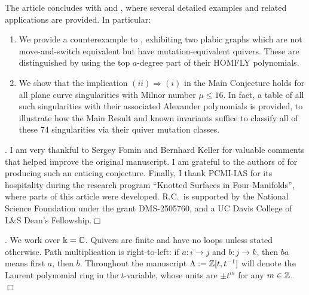 \noindent The article concludes with  and , where several detailed examples and related applications are provided. In particular:

\begin{enumerate}
    \item We provide a counterexample to \cite[Conjecture 6.17]{FPST}, exhibiting two plabic graphs which are not move-and-switch equivalent but have mutation-equivalent quivers. These are distinguished by using the top $a$-degree part of their HOMFLY polynomials.\\

    \item We show that the implication $(ii)\Longrightarrow(i)$ in the Main Conjecture holds for all plane curve singularities with Milnor number $\mu\leq16$. In fact, a table of all such singularities with their associated Alexander polynomials is provided, to illustrate how the Main Result and known invariants suffice to classify all of these 74 singularities via their quiver mutation classes.\\
\end{enumerate}


. I am very thankful to Sergey Fomin and Bernhard Keller for valuable comments that helped improve the original manuscript. I am grateful to the authors of \cite{FPST} for producing such an enticing conjecture. Finally, I thank PCMI-IAS for its hospitality during the research program ``Knotted Surfaces in Four-Manifolds'', where parts of this article were developed. R.C.~is supported by the National Science Foundation under the grant DMS-2505760, and a UC Davis College of L\&S Dean's Fellowship.\hfill$\Box$

\vspace{0.3cm}
.
We work over \(\Bbbk=\mathbb C\).  Quivers are finite and have no loops unless stated
otherwise.  Path multiplication is right-to-left: if \(a:i\to j\) and
\(b:j\to k\), then \(ba\) means first \(a\), then \(b\). Throughout the manuscript $\Lambda:=\mathbb Z[t,t^{-1}]$ will denote the Laurent polynomial ring in the $t$-variable, whose units are $\pm t^{m}$ for any $m\in\mathbb Z$. \hfill$\Box$